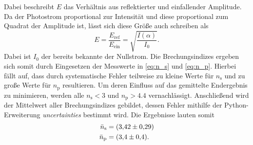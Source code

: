 Dabei beschreibt $E$ das Verhältnis aus reflektierter und einfallender Amplitude. Da der Photostrom
proportional zur Intensität und diese proportional zum Quadrat der Amplitude ist, lässt sich diese Größe auch schreiben als
\begin{equation*}
    E = \frac{E_{\text{ref}}}{E_{\text{ein}}} = \sqrt{\frac{I(\alpha)}{I_0}}.
\end{equation*}
Dabei ist $I_0$ der bereits bekannte der Nullstrom.
Die Brechungsindizes ergeben sich somit durch Eingesetzen der Messwerte in \eqref{eq:n_s} und \eqref{eq:n_p}.
Hierbei fällt auf, dass durch systematische Fehler teilweise zu kleine Werte für $n_{\text{s}}$ und zu große Werte für $n_{\text{p}}$
resultieren.
Um deren Einfluss auf das gemittelte Endergebnis zu minimieren, werden alle $n_{\text{s}}<3$ und $n_{\text{p}}>4.4$
vernachlässigt.
Anschließend wird der Mittelwert aller Brechungsindizes gebildet, dessen Fehler mithilfe der Python-Erweiterung
\textit{uncertainties} \cite{uncertainties} bestimmt wird. Die Ergebnisse lauten somit
\begin{align*}
    \bar{n}_{\text{s}}&=\qty{3.42+-0.29}{} \\
    \bar{n}_{\text{p}}&=\qty{3.4+-0.4}{}.
\end{align*}


